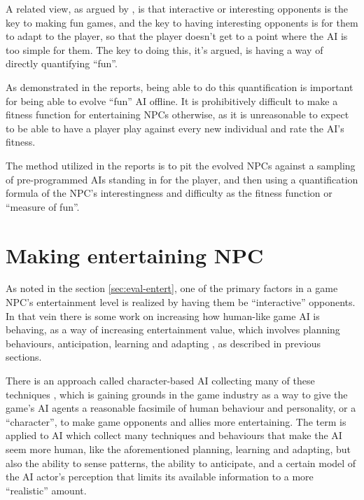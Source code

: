 \documentclass[]{report}
\begin{document}
A related view, as argued by
\citet{yannakakis2004interactive,yannakakis2004evolving}, is that interactive or
interesting opponents is the key to making fun games, and the key to having
interesting opponents is for them to adapt to the player, so that the player
doesn't get to a point where the AI is too simple for them. The key to doing
this, it's argued, is having a way of directly quantifying ``fun''.

As demonstrated in the reports, being able to do this quantification is
important for being able to evolve ``fun'' AI offline. It is prohibitively
difficult to make a fitness function for entertaining NPCs otherwise, as it is
unreasonable to expect to be able to have a player play against every new
individual and rate the AI's fitness.

The method utilized in the reports is to pit the evolved NPCs against a sampling
of pre-programmed AIs standing in for the player, and then using a
quantification formula of the NPC's interestingness and difficulty as the
fitness function or ``measure of fun''.

\section{Making entertaining NPC}
\label{sec:making-entert-npc}

As noted in the section \ref{sec:eval-entert}, one of the primary factors in a game NPC's
entertainment level is realized by having them be ``interactive'' opponents.
In that vein there is some work on increasing how human-like game AI is
behaving, as a way of increasing entertainment value, which involves planning
behaviours, anticipation, learning and adapting
\citep{orkin2004symbolic,orkin2003applying,
  yannakakis2009real,spronck2005adaptive}, as described in previous sections.

There is an approach called character-based AI collecting many of these
techniques \citep{isla2002new}, which is gaining grounds in the game industry as
a way to give the game's AI agents a reasonable facsimile of human behaviour and
personality, or a ``character'', to make game opponents and allies more
entertaining. The term is applied to AI which collect many techniques and
behaviours that make the AI seem more human, like the aforementioned planning,
learning and adapting, but also the ability to sense patterns, the ability to
anticipate, and a certain model of the AI actor's perception that limits its
available information to a more ``realistic'' amount.
\end{document}
